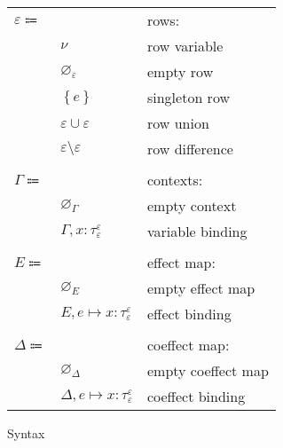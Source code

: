 \documentclass[12pt]{article}
\newcommand\anno[2]{#1 : #2}
\newcommand\evar{x}
\newcommand\tembellished[3]{{#1}^{#2}_{#3}}
\newcommand\proper{\tau}
\newcommand\row{\varepsilon}
\newcommand\rvar{\nu}
\newcommand\rempty{\varnothing_{\row}}
\newcommand\rsingleton[1]{\left\{ #1 \right\}}
\newcommand\runion[2]{#1 \cup #2}
\newcommand\rdiff[2]{#1 \setminus #2}
\newcommand\context{\Gamma}
\newcommand\cempty{\varnothing_{\context}}
\newcommand\cextend[2]{#1, #2}
\newcommand\effect{e}
\newcommand\effectmap{E}
\newcommand\coeffectmap{\Delta}
\newcommand\emempty{\varnothing_{\effectmap}}
\newcommand\ecomempty{\varnothing_{\coeffectmap}}
\newcommand\emmap[2]{#1 \mapsto #2}
\newcommand\emextend[2]{#1, #2}
\begin{document}
\begin{figure}[H]
\begin{mdframed}[backgroundcolor=none]
\begin{center}
\begin{tabular}{l l l}
              $\row \Coloneqq$ & & rows: \\
              & $\rvar$ & row variable \\
              & $\rempty$ & empty row \\
              & $\rsingleton{\effect}$ & singleton row \\
              & $\runion{\row}{\row}$ & row union \\
              & $\rdiff{\row}{\row}$ & row difference \\
              \\
              $\context \Coloneqq$ & & contexts: \\
              & $\cempty$ & empty context \\
              & $\cextend{\context}{\anno{\evar}{\tembellished{\proper}{\row}{\row}}}$ & variable binding \\
              \\
              $\effectmap \Coloneqq$ & & effect map: \\
              & $\emempty$ & empty effect map \\
              & $\emextend{\effectmap}{\emmap{\effect}{\anno{\evar}{\tembellished{\proper}{\row}{\row}}}}$ & effect binding \\
              \\
              $\coeffectmap \Coloneqq$ & & coeffect map: \\
              & $\ecomempty$ & empty coeffect map \\
              & $\emextend{\coeffectmap}{\emmap{\effect}{\anno{\evar}{\tembellished{\proper}{\row}{\row}}}}$ & coeffect binding \\
            \end{tabular}
          \end{center}

          \caption{Syntax}\label{fig:syntax}
        \end{mdframed}
      \end{figure}
\end{document}
